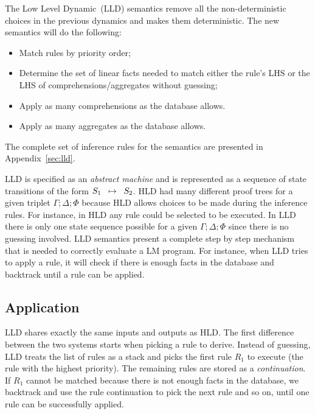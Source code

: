 The Low Level Dynamic~(LLD) semantics remove all the non-deterministic choices
in the previous dynamics and makes them deterministic. The new semantics will do
the following:

\begin{itemize}

   \item Match rules by priority order;


   \item Determine the set of linear facts needed to match either the rule's LHS
      or the LHS of comprehensions/aggregates without guessing;

   \item Apply as many comprehensions as the database allows.

   \item Apply as many aggregates as the database allows.

\end{itemize}

The complete set of inference rules for the semantics are presented in
Appendix~\ref{sec:lld}.

LLD is specified as an \emph{abstract machine} and is represented as a sequence
of state transitions of the form $S_1 \;\; \mapsto \;\; S_2$. HLD had many different
proof trees for a given triplet $\Gamma; \Delta; \Phi$ because HLD allows
choices to be made during the inference rules. For instance, in HLD any rule
could be selected to be executed.  In LLD there is only one state sequence
possible for a given $\Gamma; \Delta; \Phi$ since there is no guessing involved.
LLD semantics present a complete step by step mechanism that is needed to
correctly evaluate a LM program. For instance, when LLD tries to apply a rule,
it will check if there is enough facts in the database and backtrack
until a rule can be applied.

\subsection{Application}

LLD shares exactly the same inputs and outputs as HLD. The first difference
between the two systems starts when picking a rule to derive.  Instead of
guessing, LLD treats the list of rules as a stack and picks the first rule $R_1$
to execute (the rule with the highest priority). The remaining rules are stored
as a \emph{continuation}. If $R_1$ cannot be matched because there is not enough
facts in the database, we backtrack and use the rule continuation to pick the
next rule and so on, until one rule can be successfully applied.


